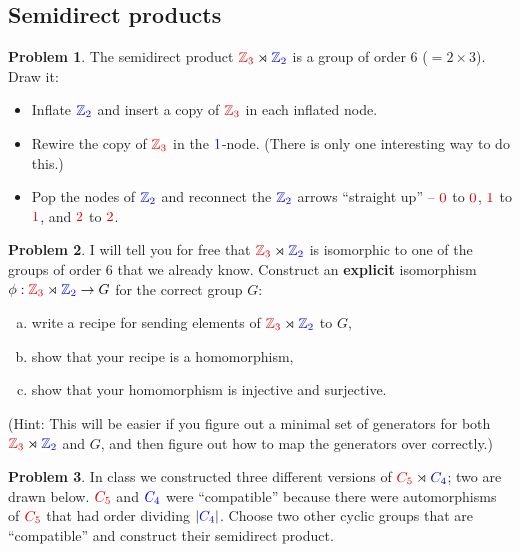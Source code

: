 \documentclass[12pt]{article}
\theoremstyle{definition} %
\newtheorem{problem}{Problem}
\begin{document}
\subsection*{Semidirect products}

\begin{problem}
    The semidirect product \(\Alert{\Z_3} \rtimes \Balert{\Z_2}\) is a group of order 6 ($=2\times 3$). Draw it:
    \begin{itemize}
        \item Inflate $\Balert{\Z_2}$ and insert a copy of $\Alert{\Z_3}$ in each inflated node.
        \item Rewire the copy of $\Alert{\Z_3}$ in the $\Balert{1}$-node. (There is only one interesting way to do this.)
        \item Pop the nodes of $\Balert{\Z_2}$ and reconnect the $\Balert{\Z_2}$ arrows ``straight up'' -- $\Alert{0}$ to $\Alert{0}$, $\Alert{1}$ to $\Alert{1}$, and $\Alert{2}$ to $\Alert{2}$.
    \end{itemize}
\end{problem}

\begin{problem}
    I will tell you for free that \(\Alert{\Z_3} \rtimes \Balert{\Z_2}\) is isomorphic to one of the groups of order 6 that we already know. Construct an \textbf{explicit} isomorphism $\phi:\Alert{\Z_3} \rtimes \Balert{\Z_2} \to G$ for the correct group $G$:
    \begin{enumerate}[(a)]
        \item write a recipe for sending elements of \(\Alert{\Z_3} \rtimes \Balert{\Z_2}\) to $G$,
        \item show that your recipe is a homomorphism,
        \item show that your homomorphism is injective and surjective.
    \end{enumerate}
    (Hint: This will be easier if you figure out a minimal set of generators for both \(\Alert{\Z_3} \rtimes \Balert{\Z_2}\) and $G$, and then figure out how to map the generators over correctly.)
\end{problem}

\pagebreak

\begin{problem}
    In class we constructed three different versions of $\Alert{C_5}\rtimes \Balert{C_4}$; two are drawn below. $\Alert{C_5}$ and $\Balert{C_4}$ were ``compatible'' because there were automorphisms of $\Alert{C_5}$ that had order dividing $|\Balert{C_4}|$. Choose two other cyclic groups that are ``compatible'' and construct their semidirect product.
\end{problem}
\end{document}
